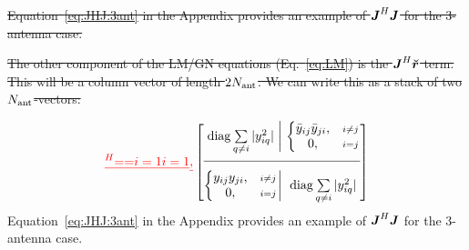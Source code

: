 \documentclass[useAMS,usenatbib]{mn2e}
\makeatletter
\newcommand{\mat}[1]{{\bmath{#1}}}
\newcommand{\JJ}{\mat{J}} %
\newcommand{\Matrix}[2]{\left [ \begin{array}{@{}#1@{}}#2\end{array} \right ]}
\newcommand{\Stack}[1]{\begin{array}{@{}c@{}}#1\end{array}}
\newcommand{\AUG}[1]{\bmath{\breve{#1}}}
\newcommand{\Rr}{\AUG{r}}
\numberwithin{equation}{section} %
\providecommand{\DIFdel}[1]{{\protect\color{red}\sout{#1}}}                      %
\providecommand{\DIFaddbegin}{} %
\providecommand{\DIFdelend}{} %
\makeatother
\begin{document}
\DIFdel{Equation~\ref{eq:JHJ:3ant} in the Appendix provides an example of $\JJ^H\JJ$ for the 3-antenna case. 
}%


\DIFdel{The other component of the LM/GN equations (Eq.~\ref{eq:LM}) is the $\JJ^H\Rr$ term. This will be a column vector of length $2N_\mathrm{ant}$. We can write this as a stack of two $N_\mathrm{ant}$-vectors:
}%

\begin{equation}%
\DIFdel{^H}%
\DIFdel{= }%
\DIFdel{= }%
\DIFdel{i=1}%
\DIFdel{i=1}%
\DIFdel{,
}%
\DIFdelend \DIFaddbegin \JHJblocksFull{
\mathrm{diag} \sum\limits_{q\ne i} |y_{iq}^2| 
}{
  \left \{ 
  \begin{array}{@{}cc@{}}
   \bar{y}_{ij} \bar{y}_{ji}, &{\scriptstyle i\ne j} \\
   0, &{\scriptstyle i=j}
  \end{array} \right .
}{
  \left \{ 
  \begin{array}{@{}cc@{}}
   y_{ij}y_{ji},&{\scriptstyle i\ne j} \\
   0, &{\scriptstyle i=j}
  \end{array} \right . 
}{
  \mathrm{diag} \sum\limits_{q\ne i} |y^2_{iq}| 
}
\end{equation}
Equation~\ref{eq:JHJ:3ant} in the Appendix provides an example of $\JJ^H\JJ$ for the 3-antenna case. 

\newcommand{\yysq}[2]{{y^2_{#1}+y^2_{#2}}}
\newcommand{\bb}[2]{{\bar{y}_{#1#2}\bar{y}_{#2#1}}}
\newcommand{\bbb}[2]{y_{#1#2}y_{#2#1}}
\end{document}
